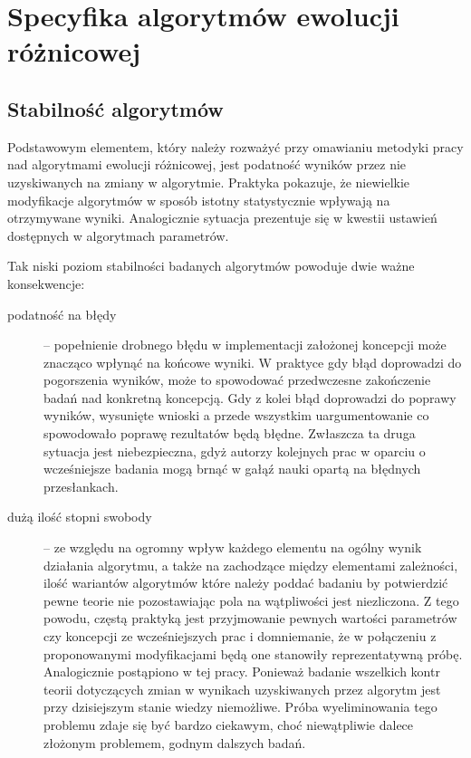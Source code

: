 \documentclass[12pt,a4paper]{report}
\begin{document}
{{{{{{\section{Specyfika algorytmów ewolucji różnicowej}
\subsection{Stabilność algorytmów}
\par{
Podstawowym elementem, który należy rozważyć przy omawianiu metodyki pracy nad algorytmami ewolucji różnicowej, jest podatność wyników przez nie uzyskiwanych na zmiany w algorytmie. Praktyka pokazuje, że niewielkie modyfikacje algorytmów w sposób istotny statystycznie wpływają na otrzymywane wyniki. Analogicznie sytuacja prezentuje się w kwestii ustawień dostępnych w algorytmach parametrów.
}
\par{
Tak niski poziom stabilności badanych algorytmów powoduje dwie ważne konsekwencje:
\begin{description}
\item[podatność na błędy] -- popełnienie drobnego błędu w implementacji założonej koncepcji może znacząco wpłynąć na końcowe wyniki. W praktyce gdy błąd doprowadzi do pogorszenia wyników, może to spowodować przedwczesne zakończenie badań nad konkretną koncepcją. Gdy z kolei błąd doprowadzi do poprawy wyników, wysunięte wnioski a przede wszystkim uargumentowanie co spowodowało poprawę rezultatów będą błędne. Zwłaszcza ta druga sytuacja jest niebezpieczna, gdyż autorzy kolejnych prac w oparciu o wcześniejsze badania mogą brnąć w gałąź nauki opartą na błędnych przesłankach.
\item[dużą ilość stopni swobody] -- ze względu na ogromny wpływ każdego elementu na ogólny wynik działania algorytmu, a także na zachodzące między elementami zależności, ilość wariantów algorytmów które należy poddać badaniu by potwierdzić pewne teorie nie pozostawiając pola na wątpliwości jest niezliczona. Z tego powodu, częstą praktyką jest przyjmowanie pewnych wartości parametrów czy koncepcji ze wcześniejszych prac i domniemanie, że w połączeniu z proponowanymi modyfikacjami będą one stanowiły reprezentatywną próbę. Analogicznie postąpiono w tej pracy. Ponieważ badanie wszelkich kontr teorii dotyczących zmian w wynikach uzyskiwanych przez algorytm jest przy dzisiejszym stanie wiedzy niemożliwe. Próba wyeliminowania tego problemu zdaje się być bardzo ciekawym, choć niewątpliwie dalece złożonym problemem, godnym dalszych badań.
\end{description}
}
}}}}}}
\end{document}

